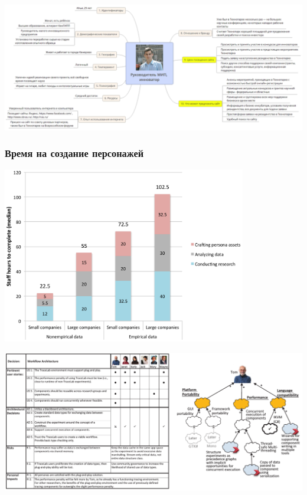 \documentclass{../../slides-style}
\begin{document}
    \begin{frame}
        \begin{center}
            \includegraphics[width=\textwidth]{ilya.png}
        \end{center}
    \end{frame}

    \begin{frame}
        \frametitle{Время на создание персонажей}
        \begin{center}
            \includegraphics[width=0.8\textwidth]{createCharactersTime.png}
        \end{center}
    \end{frame}

    \begin{frame}
        \begin{center}
            \includegraphics[width=\textwidth]{decisions.png}
        \end{center}
    \end{frame}
\end{document}
